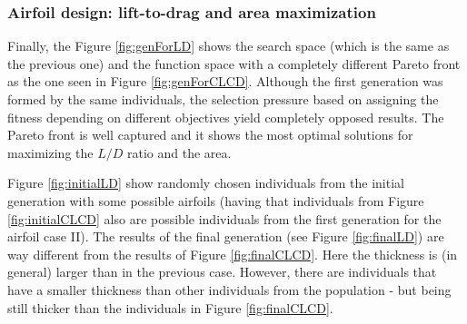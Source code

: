 \subsubsection*{Airfoil design: lift-to-drag and area maximization}

Finally, the Figure \ref{fig:genForLD} shows the search space (which is the same as the previous one) and the function space with a completely different Pareto front as the one seen in Figure \ref{fig:genForCLCD}. Although the first generation was formed by the same individuals, the selection pressure based on assigning the fitness depending on different objectives yield completely opposed results. The Pareto front is well captured and it shows the most optimal solutions for maximizing the $L/D$ ratio and the area. 

Figure \ref{fig:initialLD} show randomly chosen individuals from the initial generation with some possible airfoils (having that individuals from Figure \ref{fig:initialCLCD} also are possible individuals from the first generation for the airfoil case II). The results of the final generation (see Figure \ref{fig:finalLD}) are way different from the results of Figure \ref{fig:finalCLCD}. Here the thickness is (in general) larger than in the previous case. However, there are individuals that have a smaller thickness than other individuals from the population - but being still thicker than the individuals in Figure \ref{fig:finalCLCD}.